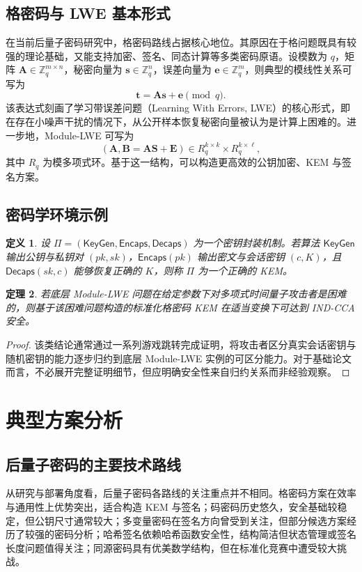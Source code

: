 ﻿\documentclass[12pt,a4paper]{ctexart}
\numberwithin{equation}{section}
\newtheorem{theorem}{定理}[section]
\newtheorem{definition}[theorem]{定义}
\begin{document}
\subsection{格密码与 LWE 基本形式}
在当前后量子密码研究中，格密码路线占据核心地位。其原因在于格问题既具有较强的理论基础，又能支持加密、签名、同态计算等多类密码原语。设模数为 $q$，矩阵 $\bm{A}\in\mathbb{Z}_q^{m\times n}$，秘密向量为 $\bm{s}\in\mathbb{Z}_q^n$，误差向量为 $\bm{e}\in\mathbb{Z}_q^m$，则典型的模线性关系可写为
\begin{equation}
    \bm{t}=\bm{A}\bm{s}+\bm{e}\pmod q.
\end{equation}
该表达式刻画了学习带误差问题（Learning With Errors, LWE）的核心形式，即在存在小噪声干扰的情况下，从公开样本恢复秘密向量被认为是计算上困难的。进一步地，Module-LWE 可写为
\begin{equation}
    (\bm{A},\bm{B}=\bm{A}\bm{S}+\bm{E}) \in R_q^{k\times k}\times R_q^{k\times \ell},
\end{equation}
其中 $R_q$ 为模多项式环。基于这一结构，可以构造更高效的公钥加密、KEM 与签名方案。

\subsection{密码学环境示例}
\begin{definition}
设 $\Pi=(\mathsf{KeyGen},\mathsf{Encaps},\mathsf{Decaps})$ 为一个密钥封装机制。若算法 $\mathsf{KeyGen}$ 输出公钥与私钥对 $(pk,sk)$，$\mathsf{Encaps}(pk)$ 输出密文与会话密钥 $(c,K)$，且 $\mathsf{Decaps}(sk,c)$ 能够恢复正确的 $K$，则称 $\Pi$ 为一个正确的 KEM。
\end{definition}

\begin{theorem}
若底层 Module-LWE 问题在给定参数下对多项式时间量子攻击者是困难的，则基于该困难问题构造的标准化格密码 KEM 在适当变换下可达到 IND-CCA 安全。
\end{theorem}

\begin{proof}
该类结论通常通过一系列游戏跳转完成证明，将攻击者区分真实会话密钥与随机密钥的能力逐步归约到底层 Module-LWE 实例的可区分能力。对于基础论文而言，不必展开完整证明细节，但应明确安全性来自归约关系而非经验观察。
\end{proof}

\section{典型方案分析}
\subsection{后量子密码的主要技术路线}
从研究与部署角度看，后量子密码各路线的关注重点并不相同。格密码方案在效率与通用性上优势突出，适合构造 KEM 与签名；码密码历史悠久，安全基础较稳定，但公钥尺寸通常较大；多变量密码在签名方向曾受到关注，但部分候选方案经历了较强的密码分析；哈希签名依赖哈希函数安全性，结构简洁但状态管理或签名长度问题值得关注；同源密码具有优美数学结构，但在标准化竞赛中遭受较大挑战。
\end{document}
